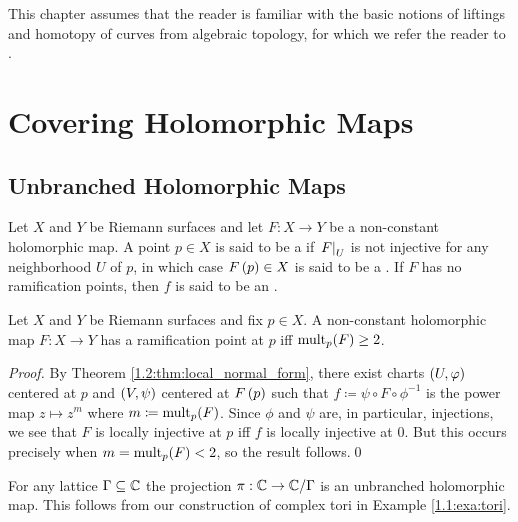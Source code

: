 \documentclass[../Moduli_Spaces_of_Riemann_Surfaces.tex]{subfiles}
\begin{document}
    This chapter assumes that the reader is familiar with the basic notions of liftings and homotopy of curves from algebraic topology, for which we refer the reader to \cite[][Sections 3 and 4.7]{otto}.
    \section{Covering Holomorphic Maps}
    \subsection{Unbranched Holomorphic Maps}
    \begin{definition}
        Let $X$ and $Y$ be Riemann surfaces and let $F:X\to Y$ be a non-constant holomorphic map. A point $p\in X$ is said to be a  if $\left.F\right|_U$ is not injective for any neighborhood $U$ of $p$, in which case $F\left(p\right)\in X$ is said to be a . If $F$ has no ramification points, then $f$ is said to be an .
    \end{definition}
    \begin{proposition}
        Let $X$ and $Y$ be Riemann surfaces and fix $p\in X$. A non-constant holomorphic map $F:X\to Y$ has a ramification point at $p$ iff $\operatorname{mult}_p\!\left(F\right)\geq2$.
    \end{proposition}
    \begin{proof}
        By Theorem \ref{1.2:thm:local_normal_form}, there exist charts $\left(U,\varphi\right)$ centered at $p$ and $\left(V,\psi\right)$ centered at $F\left(p\right)$ such that $f\coloneqq\psi\circ F\circ\phi^{-1}$ is the power map $z\mapsto z^m$ where $m\coloneqq\operatorname{mult}_p\!\left(F\right)$. Since $\phi$ and $\psi$ are, in particular, injections, we see that $F$ is locally injective at $p$ iff $f$ is locally injective at $0$. But this occurs precisely when $m=\operatorname{mult}_p\!\left(F\right)<2$, so the result follows.\qed
    \end{proof}
    \begin{example}
        For any lattice $\Gamma\subseteq\mathbb{C}$ the projection $\pi:\mathbb{C}\to\mathbb{C}/\Gamma$ is an unbranched holomorphic map. This follows from our construction of complex tori in Example \ref{1.1:exa:tori}.\exqed
    \end{example}
\end{document}
